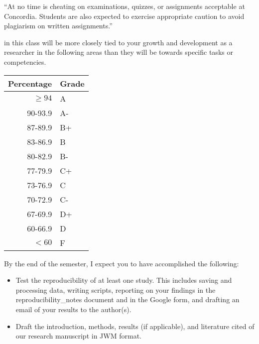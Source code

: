 \documentclass{tufte-handout}
\begin{document}

``At no time is cheating on examinations, quizzes, or assignments acceptable at Concordia. Students are also expected to exercise appropriate caution to avoid plagiarism on written assignments.''




 in this class will be more closely tied to your growth and development as a researcher in the following areas than they will be towards specific tasks or competencies. 

\begin{margintable}
\begin{tabular}{rl}
Percentage & Grade \\
\hline 
$\ge94$ & A \\
90-93.9 & A- \\
87-89.9 & B+ \\
83-86.9 & B \\
80-82.9 & B- \\
77-79.9 & C+ \\
73-76.9 & C \\
70-72.9 & C- \\
67-69.9 & D+ \\
60-66.9 & D \\
$<60$ & F \\
\hline
\end{tabular}
\end{margintable}



By the end of the semester, I expect you to have accomplished the following:

\begin{itemize}
	\item Test the reproducibility of at least one study. This includes saving and processing data, writing scripts, reporting on your findings in the reproducibility\_notes document and in the Google form, and drafting an email of your results to the author(s).
	\item Draft the introduction, methods, results (if applicable), and literature cited of our research manuscript in JWM format. 
\end{itemize}
\end{document}
